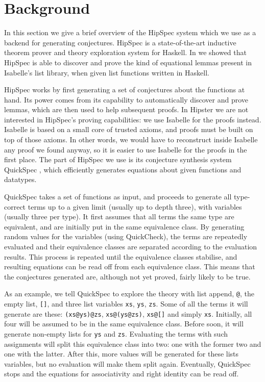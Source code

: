 \section{Background}
\label{sec:background}

In this section we give a brief overview of the HipSpec system which
we use as a backend for generating conjectures. HipSpec is a
state-of-the-art inductive theorem prover and theory exploration
system for Haskell. In \cite{hipspecCADE} we showed that HipSpec is
able to discover and prove the kind of equational lemmas present in
Isabelle's list library, when given list functions written in Haskell.

HipSpec works by first generating a set of conjectures about the
functions at hand. Its power comes from its capability to
automatically discover and prove lemmas, which are then used to help
subsequent proofs. In Hipster we are not interested in HipSpec's
proving capabilities: we use Isabelle for the proofs instead. Isabelle
is based on a small core of trusted axioms, and proofs must be built
on top of those axioms. In other words, we would have to reconstruct
inside Isabelle any proof we found anyway, so it is easier to use
Isabelle for the proofs in the first place. The part of HipSpec we use
is its conjecture synthesis system QuickSpec \cite{quickspec},
which efficiently generates equations about given functions and
datatypes.

QuickSpec takes a set of functions as input, and proceeds to generate all
type-correct terms up to a given limit (usually up to depth three), with
variables (usually three per type).  It first assumes that all terms the same
type are equivalent, and are initially put in the same equivalence class.  By
generating random values for the variables (using QuickCheck\cite{quickcheck}), the terms are repeatedly evaluated and their equivalence
classes are separated according to the evaluation results.  This process is
repeated until the equivalence classes stabilise, and resulting equations can
be read off from each equivalence class.  This means that the conjectures
generated are, although not yet proved, fairly likely to be true.

As an example, we tell QuickSpec to explore the theory with list append,
\verb~@~, the empty list, \verb~[]~, and three list variables \verb~xs~,
\verb~ys~, \verb~zs~. Some of all the terms it will generate are these:
\verb~(xs@ys)@zs~, \verb~xs@(ys@zs)~, \verb~xs@[]~ and simply \verb~xs~.
Initially, all four will be assumed to be in the same equivalence class.
Before soon, it will generate non-empty lists for \verb~ys~ and \verb~zs~.
Evaluating the terms with such assignments will split this equivalence class
into two: one with the former two and one with the latter. After this, more
values will be generated for these lists variables, but no evaluation will make
them split again. Eventually, QuickSpec stops and the equations for
associativity and right identity can be read off.

